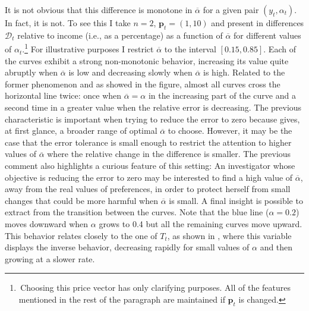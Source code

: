 \documentclass[english, a4paper, 12pt]{article}
\begin{document}
It is not obvious that this difference is monotone in $\overline{\alpha}$ for a given pair $(y_{t}, \alpha_{t})$. In fact, it is not. To see this I take $n = 2$, $\mathbf{p}_{t} = (1,10)$ and present in  differences $\mathcal{D}_{t}$ relative to income (i.e., as a percentage) as a function of $\overline{\alpha}$ for different values of $\alpha_{t}$.\footnote{\,Choosing this price vector has only clarifying purposes. All of the features mentioned in the rest of the paragraph are maintained if $\mathbf{p}_{t}$ is changed.} For illustrative purposes I restrict $\overline{\alpha}$ to the interval $[0.15, 0.85]$. Each of the curves exhibit a strong non-monotonic behavior, increasing its value quite abruptly when $\overline{\alpha}$ is low and decreasing slowly when $\overline{\alpha}$ is high. Related to the former phenomenon and as showed in the figure, almost all curves cross the horizontal line twice: once when $\overline{\alpha} = \alpha$ in the increasing part of the curve and a second time in a greater value when the relative error is decreasing. The previous characteristic is important when trying to reduce the error to zero because gives, at first glance, a broader range of optimal $\overline{\alpha}$ to choose. However, it may be the case that the error tolerance is small enough to restrict the attention to higher values of $\overline{\alpha}$ where the relative change in the difference is smaller. The previous comment also highlights a curious feature of this setting: An investigator whose objective is reducing the error to zero may be interested to find a high value of $\overline{\alpha}$, away from the real values of preferences, in order to protect herself from small changes that could be more harmful when $\overline{\alpha}$ is small. A final insight is possible to extract from the transition between the curves. Note that the blue line ($\alpha = 0.2$) moves downward when $\alpha$ grows to 0.4 but all the remaining curves move upward. This behavior relates closely to the one of $T_{t}$, as shown in , where this variable displays the inverse behavior, decreasing rapidly for small values of $\alpha$ and then growing at a slower rate. 
\end{document}
